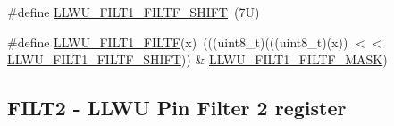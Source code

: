 \begin{DoxyCompactItemize}
\#define \mbox{\hyperlink{group___l_l_w_u___register___masks_ga359dd7a99c209dc7c2f26d79c061d11e}{L\+L\+W\+U\+\_\+\+F\+I\+L\+T1\+\_\+\+F\+I\+L\+T\+F\+\_\+\+S\+H\+I\+FT}}~(7\+U)
\item 
\#define \mbox{\hyperlink{group___l_l_w_u___register___masks_ga178c6ff91d71caeb12b9444cd028e09d}{L\+L\+W\+U\+\_\+\+F\+I\+L\+T1\+\_\+\+F\+I\+L\+TF}}(x)~(((uint8\+\_\+t)(((uint8\+\_\+t)(x)) $<$$<$ \mbox{\hyperlink{group___l_l_w_u___register___masks_ga359dd7a99c209dc7c2f26d79c061d11e}{L\+L\+W\+U\+\_\+\+F\+I\+L\+T1\+\_\+\+F\+I\+L\+T\+F\+\_\+\+S\+H\+I\+FT}})) \& \mbox{\hyperlink{group___l_l_w_u___register___masks_gabdb5ca902522996074a75ed08a7a8b03}{L\+L\+W\+U\+\_\+\+F\+I\+L\+T1\+\_\+\+F\+I\+L\+T\+F\+\_\+\+M\+A\+SK}})
\end{DoxyCompactItemize}
\subsection*{F\+I\+L\+T2 -\/ L\+L\+WU Pin Filter 2 register}
